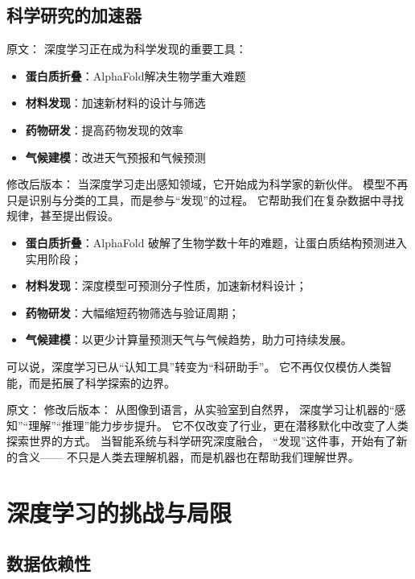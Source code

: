 \subsection{科学研究的加速器}

原文：
深度学习正在成为科学发现的重要工具：

\begin{itemize}
\item \textbf{蛋白质折叠}：AlphaFold解决生物学重大难题
\item \textbf{材料发现}：加速新材料的设计与筛选
\item \textbf{药物研发}：提高药物发现的效率
\item \textbf{气候建模}：改进天气预报和气候预测
\end{itemize}
修改后版本：
当深度学习走出感知领域，它开始成为科学家的新伙伴。  
模型不再只是识别与分类的工具，而是参与“发现”的过程。  
它帮助我们在复杂数据中寻找规律，甚至提出假设。  

\begin{itemize}
\item \textbf{蛋白质折叠}：AlphaFold 破解了生物学数十年的难题，让蛋白质结构预测进入实用阶段；
\item \textbf{材料发现}：深度模型可预测分子性质，加速新材料设计；
\item \textbf{药物研发}：大幅缩短药物筛选与验证周期；
\item \textbf{气候建模}：以更少计算量预测天气与气候趋势，助力可持续发展。
\end{itemize}

可以说，深度学习已从“认知工具”转变为“科研助手”。  
它不再仅仅模仿人类智能，而是拓展了科学探索的边界。



原文：
修改后版本：
从图像到语言，从实验室到自然界，  
深度学习让机器的“感知”“理解”“推理”能力步步提升。  
它不仅改变了行业，更在潜移默化中改变了人类探索世界的方式。  
当智能系统与科学研究深度融合，  
“发现”这件事，开始有了新的含义——  
不只是人类去理解机器，而是机器也在帮助我们理解世界。


\section{深度学习的挑战与局限}

\subsection{数据依赖性}

